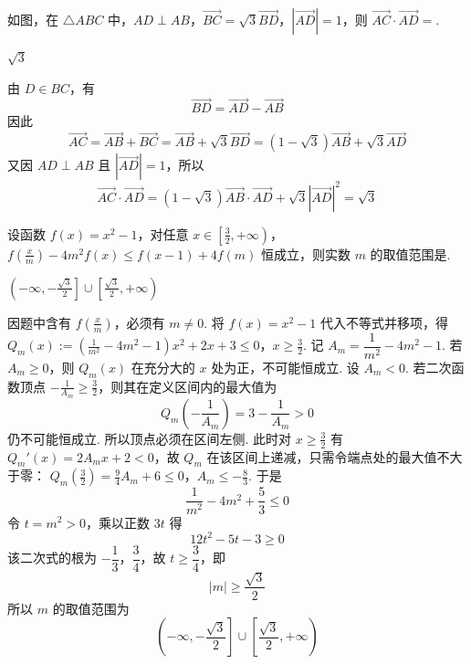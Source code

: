 \begin{problem}
如图，在 \(\triangle ABC\) 中，\(AD \perp AB\)，\(\overrightarrow{BC} = \sqrt{3}\overrightarrow{BD}\)，\(|\overrightarrow{AD}| = 1\)，则 \(\overrightarrow{AC} \cdot \overrightarrow{AD} =\)\fillinblank{}.

\begin{answer}
\(\sqrt{3}\)
\end{answer}
\begin{solution}
由 \(D\in BC\)，有
\[
\overrightarrow{BD}=\overrightarrow{AD}-\overrightarrow{AB}
\]
因此
\[
\overrightarrow{AC}=\overrightarrow{AB}+\overrightarrow{BC}
=\overrightarrow{AB}+\sqrt3\overrightarrow{BD}
=(1-\sqrt3)\overrightarrow{AB}+\sqrt3\overrightarrow{AD}
\]
又因 \(AD\perp AB\) 且 \(|\overrightarrow{AD}|=1\)，所以
\[
\overrightarrow{AC}\cdot\overrightarrow{AD}
=(1-\sqrt3)\overrightarrow{AB}\cdot\overrightarrow{AD}
+\sqrt3\left|\overrightarrow{AD}\right|^2
=\sqrt3
\]
\end{solution}
\end{problem}

\begin{problem}
设函数 \( f(x) = x^2 - 1 \)，对任意 \( x \in \left[\frac{3}{2}, +\infty\right) \)，\( f\left(\frac{x}{m}\right) - 4m^2f(x) \leqslant f(x - 1) + 4f(m) \) 恒成立，则实数 \( m \) 的取值范围是\fillinblank{}.
\begin{answer}
\(\left(-\infty,-\frac{\sqrt{3}}{2}\right]\cup\left[\frac{\sqrt{3}}{2},+\infty\right)\)
\end{answer}
\begin{solution}
因题中含有 \(f(\frac{x}{m})\)，必须有 \(m\ne0\). 将 \(f(x)=x^2-1\) 代入不等式并移项，得
\(Q_m(x):=\left(\frac1{m^2}-4m^2-1\right)x^2+2x+3\le0\)，\(x\ge\frac32\).
记 \(A_m=\dfrac1{m^2}-4m^2-1\). 若 \(A_m\ge0\)，则 \(Q_m(x)\) 在充分大的 \(x\) 处为正，不可能恒成立. 设 \(A_m<0\). 若二次函数顶点 \(-\frac{1}{A_m}\ge\frac{3}{2}\)，则其在定义区间内的最大值为
\[
Q_m\left(-\frac1{A_m}\right)=3-\frac1{A_m}>0
\]
仍不可能恒成立. 所以顶点必须在区间左侧. 此时对 \(x\ge\frac{3}{2}\) 有 \(Q_m'(x)=2A_mx+2<0\)，故 \(Q_m\) 在该区间上递减，只需令端点处的最大值不大于零：
\(Q_m\left(\frac32\right)=\frac94A_m+6\le0\)，\(A_m\le-\frac83\).
于是
\[
\frac1{m^2}-4m^2+\frac53\le0
\]
令 \(t=m^2>0\)，乘以正数 \(3t\) 得
\[
12t^2-5t-3\ge0
\]
该二次式的根为 \(-\dfrac13\)，\(\dfrac34\)，故 \(t\ge\dfrac34\)，即
\[
|m|\ge\frac{\sqrt3}{2}
\]
所以 \(m\) 的取值范围为
\[
\left(-\infty,-\frac{\sqrt3}{2}\right]\cup\left[\frac{\sqrt3}{2},+\infty\right)
\]
\end{solution}
\end{problem}

